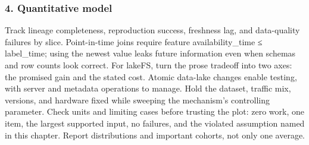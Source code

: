 \subsubsection*{4. Quantitative model}
Track lineage completeness, reproduction success, freshness lag, and data-quality failures by slice. Point-in-time joins require feature availability\_time ≤ label\_time; using the newest value leaks future information even when schemas and row counts look correct.
For lakeFS, turn the prose tradeoff into two axes: the promised gain and the stated cost. Atomic data-lake changes enable testing, with server and metadata operations to manage. Hold the dataset, traffic mix, versions, and hardware fixed while sweeping the mechanism's controlling parameter.
Check units and limiting cases before trusting the plot: zero work, one item, the largest supported input, no failures, and the violated assumption named in this chapter. Report distributions and important cohorts, not only one average.
